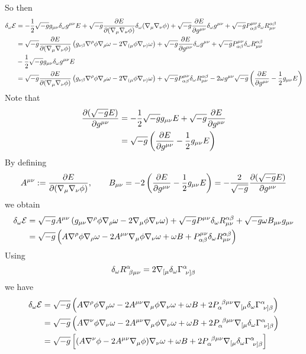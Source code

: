 So then
\begin{align*}
  \delta_\omega \mathcal{E}&=-\frac{1}{2}\sqrt{-g}g_{\mu\nu }\delta_\omega g^{\mu\nu }E+\sqrt{-g}\pdv{E}{(\nabla_\mu\nabla_\nu\phi)}\delta_\omega (\nabla_\mu \nabla_\nu \phi )+\sqrt{-g}\pdv{E}{g^{\mu\nu}}\delta_\omega g^{\mu\nu }+\sqrt{-g}P^{\mu\nu }_{\alpha\beta }\delta_\omega R^{\alpha\beta }_{\mu\nu }\\
  &=\sqrt{-g}\pdv{E}{(\nabla_\mu\nabla_\nu\phi)}\left(g_{\nu\beta }\nabla^\rho \phi\nabla_\rho\omega-2\nabla_{(\mu }\phi\nabla_{\nu)}\omega\right)+\sqrt{-g}\pdv{E}{g^{\mu\nu}}\delta_\omega g^{\mu\nu }+\sqrt{-g}P^{\mu\nu }_{\alpha\beta }\delta_\omega R^{\alpha\beta }_{\mu\nu }\\& -\frac{1}{2}\sqrt{-g}g_{\mu\nu }\delta_\omega g^{\mu\nu }E\\
  &=\sqrt{-g}\pdv{E}{(\nabla_\mu\nabla_\nu\phi)}\left(g_{\nu\beta }\nabla^\rho \phi\nabla_\rho\omega-2\nabla_{(\mu }\phi\nabla_{\nu)}\omega\right)+\sqrt{-g}P^{\mu\nu }_{\alpha\beta }\delta_\omega R^{\alpha\beta }_{\mu\nu }-2\omega g^{\mu\nu}\sqrt{-g}\left(\pdv{E}{g^{\mu\nu}}-\frac{1}{2}g_{\mu\nu }E\right)
\end{align*}
Note that
\begin{align}
  \pdv{(\sqrt{-g}E)}{g^{\mu\nu}}&=-\frac{1}{2}\sqrt{-g}g_{\mu\nu }E+\sqrt{-g}\pdv{E}{g^{\mu\nu}}\\
  &=\sqrt{-g}\left(\pdv{E}{g^{\mu\nu}}-\frac{1}{2}g_{\mu\nu }E\right) \label{d-sqrt-E}
\end{align}
By defining
\begin{align}\label{A-B}
  A^{\mu\nu }:=\pdv{E}{(\nabla_\mu\nabla_\nu\phi)},\qquad B_{\mu\nu }=-2\left(\pdv{E}{g^{\mu\nu}}-\frac{1}{2}g_{\mu\nu }E\right)=-\frac{2}{\sqrt{-g}}\pdv{(\sqrt{-g}E)}{g^{\mu\nu}}
\end{align}
we obtain
\begin{align}
  \delta_\omega \mathcal{E}&=\sqrt{-g}A^{\mu\nu }\left(g_{\mu\nu }\nabla^\rho \phi \nabla_\rho \omega-2\nabla_\mu \phi\nabla_\nu \omega\right)+\sqrt{-g}P^{\mu\nu }\delta_\omega R^{\alpha\beta }_{\mu\nu }+\sqrt{-g}\omega B_{\mu\nu }g_{\mu\nu }\\
  &=\sqrt{-g}\left(A\nabla^\rho \phi\nabla_\rho \omega-2A^{\mu\nu}\nabla_\mu \phi\nabla_\nu\omega+\omega B+P^{\mu\nu}_{\alpha\beta}\delta_\omega R^{\alpha\beta }_{\mu\nu }\right)
\end{align}
Using
\begin{equation}
  \delta_\omega R^\alpha _{~\beta\mu\nu }=2\nabla_{[\mu }\delta_\omega \Gamma^\alpha _{~\nu]\beta }
\end{equation}
we have
\begin{align}
    \delta_\omega \mathcal{E}&=\sqrt{-g}\left(A\nabla^\rho \phi\nabla_\rho \omega-2A^{\mu\nu}\nabla_\mu \phi\nabla_\nu\omega+\omega B+2P_\alpha ^{~\beta\mu\nu }\nabla_{[\mu }\delta_\omega \Gamma^{\alpha }_{~\nu]\beta }\right)\\
    &=\sqrt{-g}\left(A\nabla^\nu \phi\nabla_\nu  \omega-2A^{\mu\nu}\nabla_\mu \phi\nabla_\nu\omega+\omega B+2P_\alpha ^{~\beta\mu\nu }\nabla_{[\mu }\delta_\omega \Gamma^{\alpha }_{~\nu]\beta }\right)\\
    &=\sqrt{-g}\left[(A\nabla^\nu \phi -2A^{\mu\nu }\nabla_\mu\phi )\nabla_\nu \omega+\omega B+2P_\alpha ^{~\beta\mu\nu }\nabla_{[\mu }\delta_\omega \Gamma^{\alpha }_{~\nu]\beta }\right]
\end{align}

